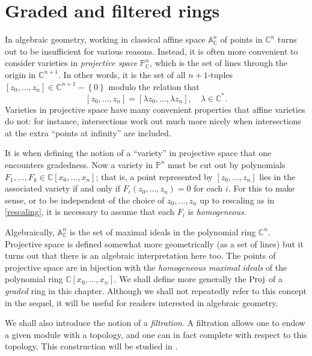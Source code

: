 \chapter{Graded and filtered rings}

In algebraic geometry, working in classical affine space
$\mathbb{A}^n_{\mathbb{C}}$ of points in $\mathbb{C}^n$ turns out to be
insufficient for various reasons.
Instead, it is often more convenient to consider varieties in \emph{projective
space} $\mathbb{P}^n_{\mathbb{C}}$, which is the set of lines through the
origin in $\mathbb{C}^{n+1}$. 
In other words, it is the set of all $n+1$-tuples $[z_0, \dots, z_n] \in
\mathbb{C}^{n+1} - \left\{0\right\}$ modulo the relation that
\begin{equation} \label{rescaling} [z_0, \dots, z_n] = [\lambda z_0, \dots, \lambda z_n], \quad \lambda \in
\mathbb{C}^*.  \end{equation}
Varieties in projective space  have many
convenient properties that affine varieties do not: for instance,
intersections work out much more nicely when intersections at the extra
``points at infinity'' are included. 

It is when defining the notion of a ``variety'' in projective space that one
encounters gradedness. Now a variety in $\mathbb{P}^n$ must be cut out by
polynomials $F_1, \dots, F_k \in \mathbb{C}[x_0, \dots, x_n]$; that is, a
point represented by $[z_0, \dots, z_n]$ lies in the associated variety if and
only if $F_i(z_0, \dots, z_n) = 0$ for each $i$. For this to make sense, or to
be independent of the choice of $z_0, \dots, z_n$ up to rescaling as in
\eqref{rescaling}, it is necessary to assume
that each $F_i$ is \emph{homogeneous.}

Algebraically, $\mathbb{A}^n_{\mathbb{C}}$ is the set of maximal ideals in the
polynomial ring $\mathbb{C}^{n}$. Projective space is defined somewhat more
geometrically (as a set of lines) but it turns out that there is an
algebraic interpretation here too. The points of projective space are in
bijection with the \emph{homogeneous maximal ideals} of the polynomial ring
$\mathbb{C}[x_0, \dots, x_n]$. We shall define  more generally the $\operatorname{Proj}$ of a
\emph{graded} ring in this chapter. Although we shall not repeatedly refer to
this concept in the sequel, it will be useful for readers interested in
algebraic geometry.

We shall also introduce the notion of a \emph{filtration}. A filtration allows
one to endow a given module with a topology, and one can in fact complete with
respect to this topology. This construction will be studied in
.

